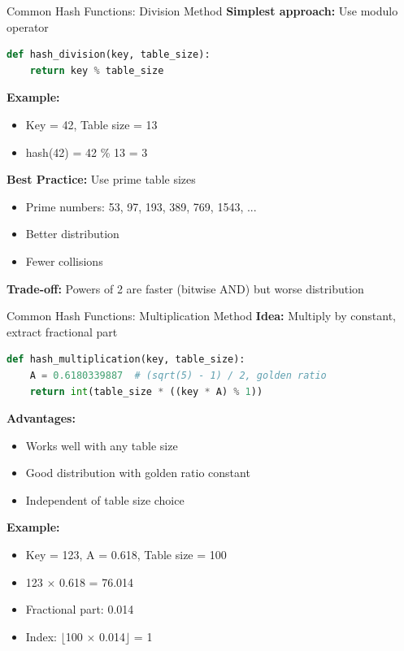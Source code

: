 \documentclass[aspectratio=169]{beamer}
\begin{document}
\begin{frame}[fragile]{Common Hash Functions: Division Method}
  \textbf{Simplest approach:} Use modulo operator

  \begin{lstlisting}[language=Python, basicstyle=\ttfamily\small]
def hash_division(key, table_size):
    return key % table_size
  \end{lstlisting}

  \vspace{0.3cm}
  \textbf{Example:}
  \begin{itemize}
    \item Key = 42, Table size = 13
    \item hash(42) = 42 \% 13 = 3
  \end{itemize}

  \vspace{0.3cm}
  \textbf{Best Practice:} Use prime table sizes
  \begin{itemize}
    \item Prime numbers: 53, 97, 193, 389, 769, 1543, ...
    \item Better distribution
    \item Fewer collisions
  \end{itemize}

  \vspace{0.3cm}
  \textbf{Trade-off:} Powers of 2 are faster (bitwise AND) but worse distribution
\end{frame}

\begin{frame}[fragile]{Common Hash Functions: Multiplication Method}
  \textbf{Idea:} Multiply by constant, extract fractional part

  \begin{lstlisting}[language=Python, basicstyle=\ttfamily\small]
def hash_multiplication(key, table_size):
    A = 0.6180339887  # (sqrt(5) - 1) / 2, golden ratio
    return int(table_size * ((key * A) % 1))
  \end{lstlisting}

  \vspace{0.3cm}
  \textbf{Advantages:}
  \begin{itemize}
    \item Works well with any table size
    \item Good distribution with golden ratio constant
    \item Independent of table size choice
  \end{itemize}

  \vspace{0.3cm}
  \textbf{Example:}
  \begin{itemize}
    \item Key = 123, A = 0.618, Table size = 100
    \item 123 $\times$ 0.618 = 76.014
    \item Fractional part: 0.014
    \item Index: $\lfloor$100 $\times$ 0.014$\rfloor$ = 1
  \end{itemize}
\end{frame}
\end{document}

